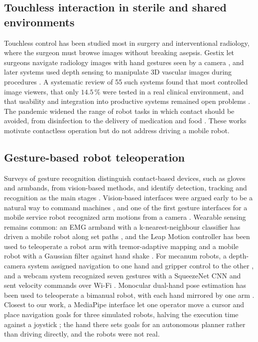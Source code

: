 \documentclass[5p,twocolumn]{elsarticle}
\begin{document}
\subsection{Touchless interaction in sterile and shared environments}
Touchless control has been studied most in surgery and interventional radiology, where the surgeon must browse images without breaking asepsis. Gestix let surgeons navigate radiology images with hand gestures seen by a camera \cite{wachs2008}, and later systems used depth sensing to manipulate 3D vascular images during procedures \cite{ohara2014}. A systematic review of 55 such systems found that most controlled image viewers, that only $14.5\,\%$ were tested in a real clinical environment, and that usability and integration into productive systems remained open problems \cite{mewes2017}. The pandemic widened the range of robot tasks in which contact should be avoided, from disinfection to the delivery of medication and food \cite{yang2020}. These works motivate contactless operation but do not address driving a mobile robot.

\subsection{Gesture-based robot teleoperation}
Surveys of gesture recognition distinguish contact-based devices, such as gloves and armbands, from vision-based methods, and identify detection, tracking and recognition as the main stages \cite{mitra2007,rautaray2015,oudah2020}. Vision-based interfaces were argued early to be a natural way to command machines \cite{wachs2011}, and one of the first gesture interfaces for a mobile service robot recognized arm motions from a camera \cite{waldherr2000}. Wearable sensing remains common: an EMG armband with a k-nearest-neighbour classifier has driven a mobile robot along set paths \cite{bisi2018}, and the Leap Motion controller has been used to teleoperate a robot arm with tremor-adaptive mapping \cite{bassily2014} and a mobile robot with a Gaussian filter against hand shake \cite{chen2024}. For mecanum robots, a depth-camera system assigned navigation to one hand and gripper control to the other \cite{luo2019}, and a webcam system recognized seven gestures with a SqueezeNet CNN and sent velocity commands over Wi-Fi \cite{zaman2023}. Monocular dual-hand pose estimation has been used to teleoperate a bimanual robot, with each hand mirrored by one arm \cite{gao2023}. Closest to our work, a MediaPipe interface let one operator move a cursor and place navigation goals for three simulated robots, halving the execution time against a joystick \cite{zick2024}; the hand there sets goals for an autonomous planner rather than driving directly, and the robots were not real.
\end{document}
